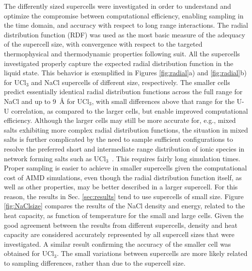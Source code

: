\documentclass[preprint,3p,10pt,onecolumn,number,sort&compress]{elsarticle}
\begin{document}
The differently sized supercells were investigated in order to understand and optimize the compromise between computational efficiency, enabling sampling in the time domain, and accuracy with respect to long range interactions. The radial distribution function (RDF) was used as the most basic measure of the adequacy of the supercell size, with convergence with respect to the targeted thermophysical and thermodynamic properties following suit. All the supercells investigated properly capture the expected radial distribution function in the liquid state. This behavior is exemplified in Figures \ref{fig:radial}a) and \ref{fig:radial}b) for UCl$_3$ and NaCl supercells of different size, respectively. The smaller cells predict essentially identical radial distribution functions across the full range for NaCl and up to 9~\AA{} for UCl$_3$, with small differences above that range for the U-U correlation, as compared to the larger cells, but enable improved computational efficiency. Although the larger cells may still be more accurate for, e.g., mixed salts exhibiting more complex radial distribution functions, the situation in mixed salts is further complicated by the need to sample sufficient configurations to resolve the preferred short and intermediate range distribution of ionic species in network forming salts such as UCl$_3$~\cite{Li}. This  requires fairly long simulation times. Proper sampling is easier to achieve in smaller supercells given the computational cost of AIMD simulations, even though the radial distribution function itself, as well as other properties, may be better described in a larger supercell. For this reason, the results in Sec. \ref{sec:results} tend to use supercells of small size.  Figure \ref{fig:NaClsize} compares the results of the NaCl density and energy, related to the heat capacity, as function of temperature for the small and large cells. Given the good agreement between the results from different supercells, density and heat capacity are considered accurately represented by all supercell sizes that were investigated. A similar result confirming the accuracy of the smaller cell was obtained for UCl$_3$.
The small variations between supercells are more likely related to sampling differences, rather than due to the supercell size. %
\end{document}
